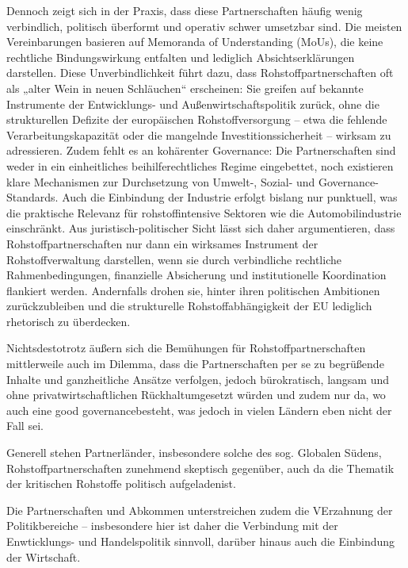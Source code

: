 \documentclass[12pt,a4paper,oneside]{book} %
\begin{document}

Dennoch zeigt sich in der Praxis, dass diese Partnerschaften häufig wenig verbindlich, politisch überformt und operativ schwer umsetzbar sind. Die meisten Vereinbarungen basieren auf Memoranda of Understanding (MoUs), die keine rechtliche Bindungswirkung entfalten und lediglich Absichtserklärungen darstellen. Diese Unverbindlichkeit führt dazu, dass Rohstoffpartnerschaften oft als „alter Wein in neuen Schläuchen“ erscheinen: Sie greifen auf bekannte Instrumente der Entwicklungs- und Außenwirtschaftspolitik zurück, ohne die strukturellen Defizite der europäischen Rohstoffversorgung – etwa die fehlende Verarbeitungskapazität oder die mangelnde Investitionssicherheit – wirksam zu adressieren. Zudem fehlt es an kohärenter Governance: Die Partnerschaften sind weder in ein einheitliches beihilferechtliches Regime eingebettet, noch existieren klare Mechanismen zur Durchsetzung von Umwelt-, Sozial- und Governance-Standards. Auch die Einbindung der Industrie erfolgt bislang nur punktuell, was die praktische Relevanz für rohstoffintensive Sektoren wie die Automobilindustrie einschränkt. Aus juristisch-politischer Sicht lässt sich daher argumentieren, dass Rohstoffpartnerschaften nur dann ein wirksames Instrument der Rohstoffverwaltung darstellen, wenn sie durch verbindliche rechtliche Rahmenbedingungen, finanzielle Absicherung und institutionelle Koordination flankiert werden. Andernfalls drohen sie, hinter ihren politischen Ambitionen zurückzubleiben und die strukturelle Rohstoffabhängigkeit der EU lediglich rhetorisch zu überdecken.

Nichtsdestotrotz äußern sich die Bemühungen für Rohstoffpartnerschaften mittlerweile auch im Dilemma, dass die Partnerschaften per se zu begrüßende Inhalte und ganzheitliche Ansätze verfolgen, jedoch \glqq bürokratisch, langsam und ohne privatwirtschaftlichen Rückhalt\grqq umgesetzt würden und zudem nur da, wo auch eine \glqq good governance\grqq besteht, was jedoch in vielen Ländern eben nicht der Fall sei.\autocite{Frenz 2025, S. 1102}

Generell stehen Partnerländer, insbesondere solche des sog. Globalen Südens, Rohstoffpartnerschaften zunehmend skeptisch gegenüber, auch da die Thematik der kritischen Rohstoffe \glqq politisch aufgeladen\grqq ist. \autocite{KAS Studie, Vom Dialog zur Lieferkette, S. 20}

Die Partnerschaften und Abkommen unterstreichen zudem die VErzahnung der Politikbereiche -- insbesondere hier ist daher die Verbindung mit der Enwticklungs- und Handelspolitik sinnvoll, darüber hinaus auch die Einbindung der Wirtschaft.
\end{document}
